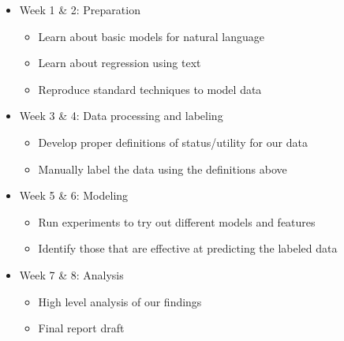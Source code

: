 \documentclass[dvips,12pt]{article}
\begin{document}
\begin{itemize}
	
	\item Week 1 \& 2: Preparation
	\begin{itemize}
		\item Learn about basic models for natural language
		\item Learn about regression using text			
		\item Reproduce standard techniques to model data
	\end{itemize}
	
	\item Week 3 \& 4: Data processing and labeling
	\begin{itemize}
		\item Develop proper definitions of status/utility for our data
		\item Manually label the data using the definitions above
	\end{itemize}
	
	\item Week 5 \& 6: Modeling
	\begin{itemize}
		\item Run experiments to try out different models and features
		\item Identify those that are effective at predicting the labeled data
	\end{itemize}
	
	\item Week 7 \& 8: Analysis
	\begin{itemize}
		\item High level analysis of our findings
		\item Final report draft
	\end{itemize}
\end{itemize}




{}


\end{document}
